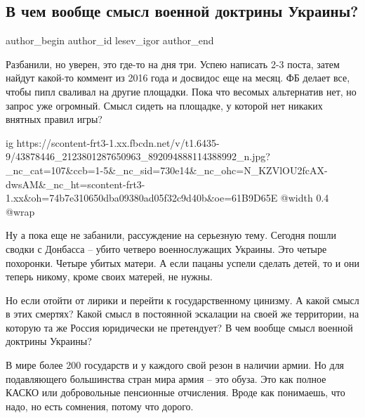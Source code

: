  
 
 
 
 
 
\subsection{В чем вообще смысл военной доктрины Украины?}
\label{sec:11_10_2018.fb.lesev_igor.1.ukr_voen_doktrina}
 
\ifcmt
 author_begin
   author_id lesev_igor
 author_end
\fi

Разбанили, но уверен, это где-то на дня три. Успею написать 2-3 поста, затем
найдут какой-то коммент из 2016 года и досвидос еще на месяц. ФБ делает все,
чтобы пипл сваливал на другие площадки. Пока что весомых альтернатив нет, но
запрос уже огромный. Смысл сидеть на площадке, у которой нет никаких внятных
правил игры?

\ifcmt
  ig https://scontent-frt3-1.xx.fbcdn.net/v/t1.6435-9/43878446_2123801287650963_892094888114388992_n.jpg?_nc_cat=107&ccb=1-5&_nc_sid=730e14&_nc_ohc=N_KZVlOU2fcAX-dwsAM&_nc_ht=scontent-frt3-1.xx&oh=74b7e310650dba09380ad05f32c9d40b&oe=61B9D65E
  @width 0.4
  @wrap 
\fi

Ну а пока еще не забанили, рассуждение на серьезную тему. Сегодня пошли сводки
с Донбасса – убито четверо военнослужащих Украины. Это четыре похоронки. Четыре
убитых матери. А если пацаны успели сделать детей, то и они теперь никому,
кроме своих матерей, не нужны.

Но если отойти от лирики и перейти к государственному цинизму. А какой смысл в
этих смертях? Какой смысл в постоянной эскалации на своей же территории, на
которую та же Россия юридически не претендует? В чем вообще смысл военной
доктрины Украины?

В мире более 200 государств и у каждого свой резон в наличии армии. Но для
подавляющего большинства стран мира армия – это обуза. Это как полное КАСКО или
добровольные пенсионные отчисления. Вроде как понимаешь, что надо, но есть
сомнения, потому что дорого.

